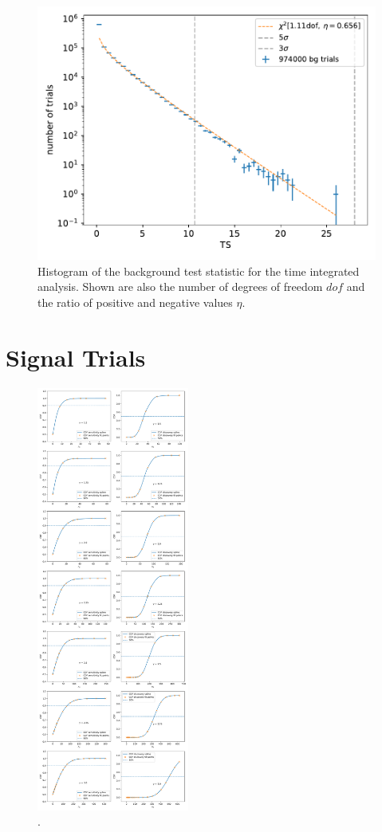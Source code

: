 \begin{figure}
    \centering
    \includegraphics[width=\linewidth]{Plots/05_csky/9_years_gfu_gold_bg_new.pdf}
    \caption{Histogram of the background test statistic for the time integrated analysis. Shown are also the number of degrees of freedom $dof$ and the ratio of positive and negative values $\eta$.}
    \label{fig:bg_ts_time_int}
\end{figure}

\section{Signal Trials}

\begin{figure}
    \centering
    \includegraphics[width=5cm]{Plots/05_csky/9_years_gfu_gold_cdf.pdf}
    \caption{.}
\end{figure}

